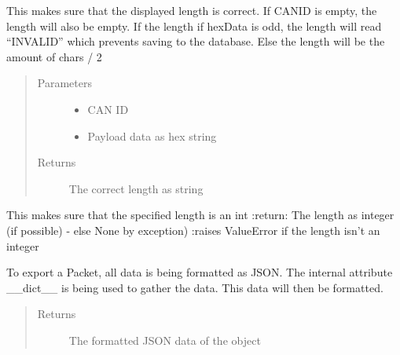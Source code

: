 \documentclass[letterpaper,10pt,english]{sphinxmanual}
\begin{document}
\begin{fulllineitems}
\begin{fulllineitems}
\label{\detokenize{src:src.Packet.Packet.getDisplayDataLength}}
This makes sure that the displayed length is correct.
If CANID is empty, the length will also be empty.
If the length if hexData is odd, the length will read “INVALID” which prevents saving to the database.
Else the length will be the amount of chars / 2
\begin{quote}\begin{description}
\item[{Parameters}] \leavevmode\begin{itemize}
\item {} 
 \textendash{} CAN ID

\item {} 
 \textendash{} Payload data as hex string

\end{itemize}

\item[{Returns}] \leavevmode
The correct length as string

\end{description}\end{quote}

\end{fulllineitems}


\begin{fulllineitems}
\label{\detokenize{src:src.Packet.Packet.lengthStringToInt}}
This makes sure that the specified length is an int
:return: The length as integer (if possible) - else None by exception)
:raises ValueError if the length isn’t an integer

\end{fulllineitems}


\begin{fulllineitems}
\label{\detokenize{src:src.Packet.Packet.toJSON}}
To export a Packet, all data is being formatted as JSON.
The internal attribute \_\_dict\_\_ is being used to gather the data.
This data will then be formatted.
\begin{quote}\begin{description}
\item[{Returns}] \leavevmode
The formatted JSON data of the object

\end{description}\end{quote}

\end{fulllineitems}


\end{fulllineitems}
\end{document}
